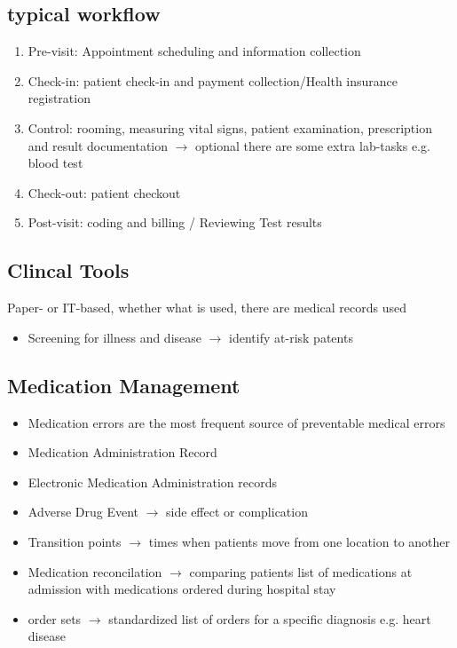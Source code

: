 \documentclass{report}
\theoremstyle{definition}
\theoremstyle{example}
\begin{document}
   \subsection{typical workflow}
   \begin{enumerate}
      \item Pre-visit: Appointment scheduling and information collection
      \item Check-in: patient check-in and payment collection/Health insurance registration
      \item Control: rooming, measuring vital signs, patient examination, prescription and result documentation $\rightarrow$ optional there are some extra lab-tasks e.g. blood test 
      \item Check-out: patient checkout
      \item Post-visit: coding and billing / Reviewing Test results
   \end{enumerate}

   \subsection{Clincal Tools}
   Paper- or IT-based, whether what is used, there are medical records used
   \begin{itemize}
      \item Screening for illness and disease $\rightarrow$ identify at-risk patents
   \end{itemize} 

   \subsection{Medication Management}
   \begin{itemize}
      \item Medication errors are the most frequent source of preventable medical errors
      \item Medication Administration Record 
      \item Electronic Medication Administration records
      \item Adverse Drug Event $\rightarrow$ side effect or complication
      \item Transition points $\rightarrow$ times when patients move from one location to another
      \item Medication reconcilation $\rightarrow$ comparing patients list of medications at admission with medications ordered during hospital stay
      \item order sets $\rightarrow$ standardized list of orders for a specific diagnosis e.g. heart disease
   \end{itemize}
\end{document}
